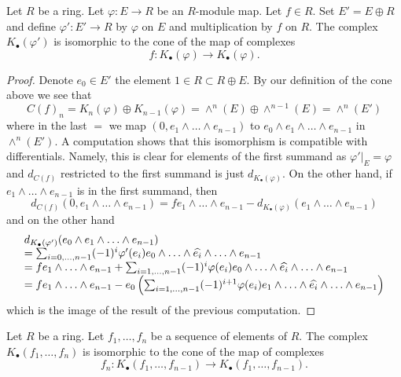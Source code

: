\begin{lemma}
\label{lemma-cone-koszul-abstract}
Let $R$ be a ring. Let $\varphi : E \to R$ be an $R$-module map.
Let $f \in R$. Set $E' = E \oplus R$ and define $\varphi' : E' \to R$
by $\varphi$ on $E$ and multiplication by $f$ on $R$.
The complex $K_\bullet(\varphi')$ is isomorphic to the
cone of the map of complexes
$$
f :
K_\bullet(\varphi)
\longrightarrow
K_\bullet(\varphi).
$$
\end{lemma}

\begin{proof}
Denote $e_0 \in E'$ the element $1 \in R \subset R \oplus E$.
By our definition of the cone above we see that
$$
C(f)_n = K_n(\varphi) \oplus K_{n - 1}(\varphi) =
\wedge^n(E) \oplus \wedge^{n - 1}(E) = \wedge^n(E')
$$
where in the last $=$ we map $(0, e_1 \wedge \ldots \wedge e_{n - 1})$
to $e_0 \wedge e_1 \wedge \ldots \wedge e_{n - 1}$ in $\wedge^n(E')$.
A computation shows that this isomorphism is compatible with
differentials. Namely, this is clear for elements of the first
summand as $\varphi'|_E = \varphi$ and $d_{C(f)}$ restricted to
the first summand is just $d_{K_\bullet(\varphi)}$.
On the other hand, if $e_1 \wedge \ldots \wedge e_{n - 1}$
is in the first summand, then
$$
d_{C(f)}(0, e_1 \wedge \ldots \wedge e_{n - 1}) =
fe_1 \wedge \ldots \wedge e_{n - 1}
- d_{K_\bullet(\varphi)}(e_1 \wedge \ldots \wedge e_{n - 1})
$$
and on the other hand
$$
\begin{matrix}
d_{K_\bullet(\varphi')}(e_0 \wedge e_1 \wedge \ldots \wedge e_{n - 1})
\hfill \\
= \sum\nolimits_{i = 0, \ldots, n - 1}
(-1)^i \varphi'(e_i)e_0 \wedge \ldots \wedge \widehat{e_i}
\wedge \ldots \wedge e_{n - 1} \hfill \\
= fe_1 \wedge \ldots \wedge e_{n - 1} +
\sum\nolimits_{i = 1, \ldots, n - 1}
(-1)^i \varphi(e_i)e_0 \wedge \ldots \wedge \widehat{e_i}
\wedge \ldots \wedge e_{n - 1} \hfill \\
= fe_1 \wedge \ldots \wedge e_{n - 1} -
e_0 \left(\sum\nolimits_{i = 1, \ldots, n - 1}
(-1)^{i + 1} \varphi(e_i)e_1 \wedge \ldots \wedge \widehat{e_i}
\wedge \ldots \wedge e_{n - 1}\right)
\end{matrix}
$$
which is the image of the result of the previous computation.
\end{proof}

\begin{lemma}
\label{lemma-cone-koszul}
Let $R$ be a ring. Let $f_1, \ldots, f_n$ be a sequence of elements
of $R$. The complex $K_\bullet(f_1, \ldots, f_n)$ is isomorphic to the
cone of the map of complexes
$$
f_n :
K_\bullet(f_1, \ldots, f_{n - 1})
\longrightarrow
K_\bullet(f_1, \ldots, f_{n - 1}).
$$
\end{lemma}

